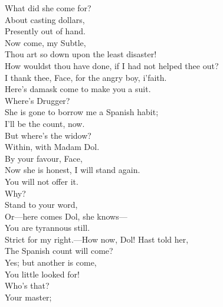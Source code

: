 \documentclass[a4paper,oneside,12pt]{memoir}
\begin{document}
\begin{drama*}
\facespeaks What did she come for?\\
\subtlespeaks {} About casting dollars,\\
Presently out of hand.\\
\facespeaks {} Now come, my Subtle,\\
Thou art so down upon the least disaster!\\
How wouldst thou have done, if I had not helped thee out?\\
\subtlespeaks I thank thee, Face, for the angry boy, i'faith.\\
\facespeaks Here's damask come to make you a suit.\\
\subtlespeaks {} Where's Drugger?\\
\facespeaks She is gone to borrow me a Spanish habit;\\
I'll be the count, now.\\
\subtlespeaks {} But where's the widow?\\
\facespeaks Within, with Madam Dol.\\
\subtlespeaks {} By your favour, Face,\\
Now she is honest, I will stand again.\\
\facespeaks You will not offer it.\\
\subtlespeaks {} Why?\\
\facespeaks {} Stand to your word,\\
Or---here comes Dol, she knows---\\
\subtlespeaks {} You are tyrannous still.\\
\facespeaks Strict for my right.---How now, Dol! Hast told her,\\
The Spanish count will come?\\
\dolspeaks {} Yes; but another is come,\\
You little looked for!\\
\facespeaks {} Who's that?\\
\dolspeaks {} Your master;\\

\end{drama*}
\end{document}
